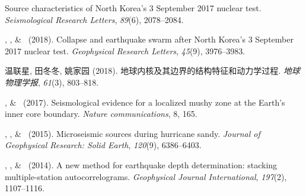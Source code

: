 \begin{etaremune}
	Source characteristics of North Korea's 3 September 2017 nuclear test.
    \emph{Seismological Research Letters}, \emph{89}(6), 2078--2084.
\item
    \Me\CS, \JYao, \& \LWen\ (2018).
    Collapse and earthquake swarm after North Korea's 3 September 2017 nuclear test.
    \emph{Geophysical Research Letters}, \emph{45}(9), 3976--3983.
\item
    温联星, 田冬冬, 姚家园 (2018).
    地球内核及其边界的结构特征和动力学过程.
    \emph{地球物理学报}, \emph{61}(3), 803--818.
\item
    \Me, \& \LWen\ (2017).
    Seismological evidence for a localized mushy zone at the Earth's inner core boundary.
    \emph{Nature communications}, 8, 165.
\item
    \XChen, \Me, \& \LWen\ (2015).
    Microseismic sources during hurricane sandy.
    \emph{Journal of Geophysical Research: Solid Earth}, \emph{120}(9), 6386--6403.
\item \MZhang, \Me, \& \LWen\ (2014).
    A new method for earthquake depth determination: stacking multiple-station autocorrelograms.
    \emph{Geophysical Journal International}, \emph{197}(2), 1107--1116.
\end{etaremune}



